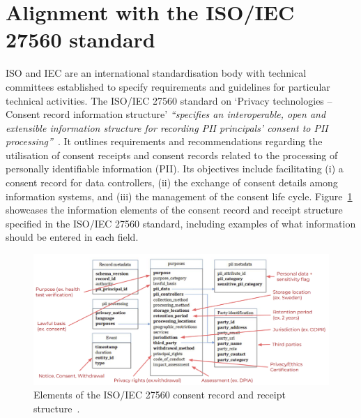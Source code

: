 \section{Alignment with the ISO/IEC 27560 standard}
\label{sec:iso_27560}

ISO and IEC are an international standardisation body with technical committees established to specify requirements and guidelines for particular technical activities.
The ISO/IEC 27560 standard on `Privacy technologies -- Consent record information structure' \textit{``specifies an interoperable, open and extensible information structure for recording PII principals' consent to PII processing''}~\citep{isoiec_jtc_1sc_27_isoiec_2023}.
It outlines requirements and recommendations regarding the utilisation of consent receipts and consent records related to the processing of personally identifiable information (PII).
Its objectives include facilitating (i) a consent record for data controllers, (ii) the exchange of consent details among information systems, and (iii) the management of the consent life cycle.
Figure~\ref{fig:iso_27560} showcases the information elements of the consent record and receipt structure specified in the ISO/IEC 27560 standard, including examples of what information should be entered in each field.

\begin{figure}[ht]
    \centering
    \includegraphics[width=1\linewidth]{figures//chapter-4/iso_27560.png}
    \caption[Elements of the ISO/IEC 27560 consent record and receipt structure.]{Elements of the ISO/IEC 27560 consent record and receipt structure~\citep{isoiec_jtc_1sc_27_isoiec_2023}.}
    \label{fig:iso_27560}
\end{figure}

